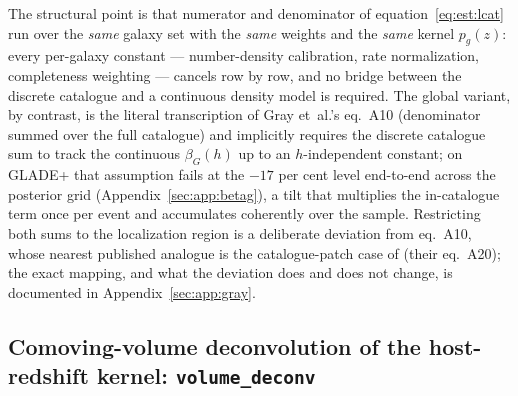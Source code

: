 The structural point is that numerator and denominator of equation~\eqref{eq:est:lcat} run over the \emph{same} galaxy set with the \emph{same} weights and the \emph{same} kernel $p_g(z)$: every per-galaxy constant --- number-density calibration, rate normalization, completeness weighting --- cancels row by row, and no bridge between the discrete catalogue and a continuous density model is required. The global variant, by contrast, is the literal transcription of Gray et~al.'s eq.~A10 (denominator summed over the full catalogue) and implicitly requires the discrete catalogue sum to track the continuous $\beta_G(h)$ up to an $h$-independent constant; on GLADE+ \citep{Dalya:2021ewn} that assumption fails at the $-17$ per cent level end-to-end across the posterior grid (Appendix~\ref{sec:app:betag}), %
a tilt that multiplies the in-catalogue term once per event and accumulates coherently over the sample. Restricting both sums to the localization region is a deliberate deviation from eq.~A10, whose nearest published analogue is the catalogue-patch case of \citet{Gray:2019ksv} (their eq.~A20); the exact mapping, and what the deviation does and does not change, is documented in Appendix~\ref{sec:app:gray}.

\subsection{Comoving-volume deconvolution of the host-redshift kernel: \texttt{volume\_deconv}}
\label{sec:est:voldeconv}

